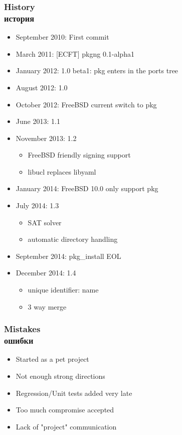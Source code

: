 \begin{frame}
	\frametitle{History \\ история}
	\begin{itemize}
		\item September 2010: First commit
		\item March 2011:  [ECFT] pkgng 0.1-alpha1
		\item January 2012: 1.0 beta1: pkg enters in the ports tree
		\item August 2012: 1.0
		\item October 2012: FreeBSD current switch to pkg
		\item June 2013: 1.1
		\item November 2013: 1.2
			\begin{itemize}
				\item FreeBSD friendly signing support
				\item libucl replaces libyaml
			\end{itemize}
		\item January 2014: FreeBSD 10.0 only support pkg
		\item July 2014: 1.3
			\begin{itemize}
				\item SAT solver
				\item automatic directory handling
			\end{itemize}
		\item September 2014: pkg\_install EOL
		\item December 2014: 1.4
			\begin{itemize}
				\item unique identifier: name
				\item 3 way merge
			\end{itemize}
	\end{itemize}
\end{frame}

\begin{frame}
	\frametitle{Mistakes \\ ошибки}
	\begin{itemize}
		\item Started as a pet project
		\item Not enough strong directions
		\item Regression/Unit tests added very late
		\item Too much compromise accepted
		\item Lack of "project" communication
	\end{itemize}
\end{frame}

